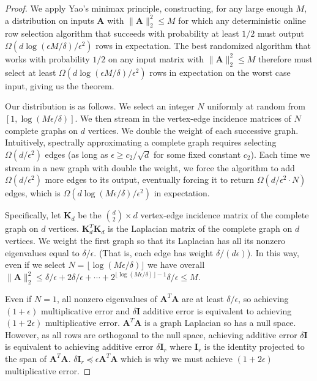 \documentclass{toc}
\newcommand{\bv}[1]{\mathbf{#1}}
\newcommand{\norm}[1]{\|#1\|}
\begin{document}
\begin{proof}
We apply Yao's minimax principle, constructing, for any large enough $M$, a distribution on inputs $\bv{A}$ with $\norm{\bv{A}}_2^2 \le M$ for which any deterministic online row selection algorithm that succeeds with probability at least $1/2$ must output  $\Omega \left (d\log(\epsilon M/\delta)/\epsilon^2 \right)$ rows in expectation. The best randomized algorithm that works with probability $1/2$ on any input matrix with $\norm{\bv{A}}_2^2 \le M$ therefore must select at least $\Omega \left (d\log(\epsilon M/\delta)/\epsilon^2 \right)$ rows in expectation on the worst case input, giving us the theorem.

Our distribution is as follows. We select an integer $N$ uniformly at random from $[1, \log(M\epsilon/\delta)]$. We then stream in the vertex-edge incidence matrices of $N$ complete graphs on $d$ vertices. We double the weight of each successive graph. Intuitively, spectrally approximating a complete graph requires selecting $\Omega(d/\epsilon^2)$ edges \cite{batson2012twice} (as long as $\epsilon \ge c_2/\sqrt{d}$ for some fixed constant $c_2$). Each time we stream in a new graph with double the weight, we force the algorithm to add $\Omega(d/\epsilon^2)$  more edges to its output, eventually forcing it to return $\Omega(d/\epsilon^2 \cdot N)$ edges, which is $\Omega(d\log(M\epsilon/\delta)/\epsilon^2)$ in expectation.

Specifically, let $\bv{K}_d$ be the $\binom{d}{2} \times d$ vertex-edge incidence matrix of the complete graph on $d$ vertices. $\bv{K}_d^T\bv{K}_d$ is the Laplacian matrix of the complete graph on $d$ vertices. We weight the first graph so that its Laplacian has all its nonzero eigenvalues equal to $\delta/\epsilon$. (That is, each edge has weight $\delta/(d\epsilon)$). In this way, even if we select $N = \lfloor \log(M\epsilon/\delta) \rfloor$ we have overall $\norm{\bv{A}}^2_2 \le \delta/\epsilon + 2\delta/\epsilon + \cdots + 2^{\lfloor \log(M\epsilon/\delta) \rfloor-1} \delta/\epsilon \le M$.

Even if $N = 1$, all nonzero eigenvalues of $\bv{A}^T\bv{A}$ are at least $\delta/\epsilon$, so achieving $(1+\epsilon)$ multiplicative error and $\delta \bv{I}$ additive error is equivalent to achieving $(1+2\epsilon)$ multiplicative error. $\bv{A}^T\bv{A}$ is a graph Laplacian so has a null space. However, as all rows are orthogonal to the null space, achieving additive error $\delta \bv{I}$ is equivalent to achieving additive error $\delta \bv{I}_r$ where $\bv{I}_r$ is the identity projected to the span of $\bv{A}^T\bv{A}$. $\delta \bv{I}_r \preceq \epsilon \bv{A}^T\bv{A}$ which is why we must achieve $(1+2\epsilon)$ multiplicative error.


\end{proof}
\end{document}
